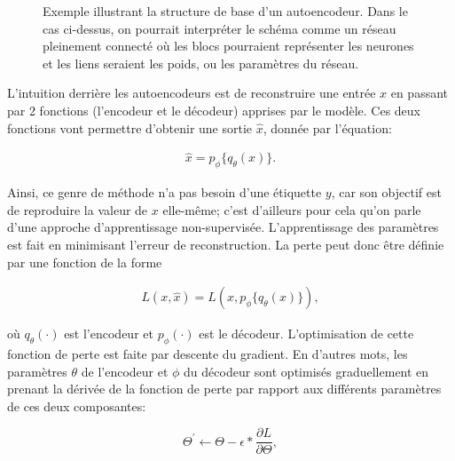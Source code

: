 \begin{figure}[h]
	\caption{Exemple illustrant la structure de base d'un autoencodeur. Dans le cas ci-dessus, on pourrait interpréter le schéma comme un réseau pleinement connecté où les blocs pourraient représenter les neurones et les liens seraient les poids, ou les paramètres du réseau.}
	\label{fig:basicAE}
\end{figure}

L'intuition derrière les autoencodeurs est de reconstruire une entrée $x$ en passant par 2  fonctions (l'encodeur et le décodeur) apprises par le modèle. Ces deux fonctions vont permettre d'obtenir une sortie $\hat{x}$, donnée par l'équation:

\begin{gather} \label{eq:output}
	\hat{x} = p_\phi{\{q_\theta(x)\}}.
\end{gather}

 Ainsi, ce genre de méthode n'a pas besoin d'une étiquette $y$, car son objectif est de reproduire la valeur de $x$ elle-même; c'est d'ailleurs pour cela qu'on parle d'une approche d'apprentissage non-supervisée. L'apprentissage des paramètres est fait en minimisant l'erreur de reconstruction. La perte peut donc être définie par une fonction de la forme

\begin{gather}  \label{eq:loss}
L(x, \hat{x}) = L(x, p_\phi{\{q_\theta(x)\}}),
\end{gather}


\noindent où $q_{\theta}(\cdot)$ est l'encodeur et $p_{\phi}(\cdot)$ est le décodeur. L'optimisation de cette fonction de perte est faite par descente du gradient. En d'autres mots, les paramètres $\theta$ de l'encodeur et $\phi$ du décodeur sont optimisés graduellement en prenant la dérivée de la fonction de perte par rapport aux différents paramètres de ces deux composantes:


\begin{equation} \label{optim}
\Theta^{'} \leftarrow \Theta-\epsilon*\frac{\partial L}{\partial\Theta},
\end{equation}

